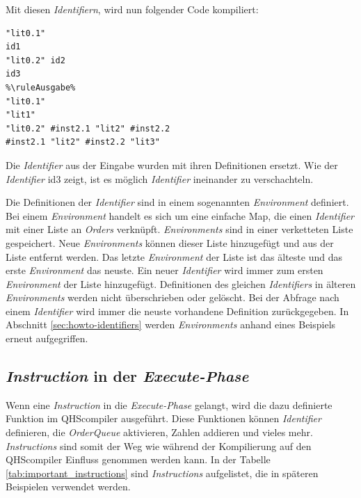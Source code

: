Mit diesen \textit{Identifiern}, wird nun folgender Code kompiliert:

\begin{lstlisting}[language=QHS, caption=QHS-Code zur Veranschaulichung von \textit{Identifiern}]
%\ruleEingabe%
"lit0.1"
id1
"lit0.2" id2
id3
%\ruleAusgabe%
"lit0.1"
"lit1"
"lit0.2" #inst2.1 "lit2" #inst2.2
#inst2.1 "lit2" #inst2.2 "lit3"
\end{lstlisting}

Die \textit{Identifier} aus der Eingabe wurden mit ihren Definitionen ersetzt. Wie der \textit{Identifier} {\listingFont\selectfont id3} zeigt, ist es möglich \textit{Identifier} ineinander zu verschachteln.

Die Definitionen der \textit{Identifier} sind in einem sogenannten \textit{Environment} definiert.
Bei einem \textit{Environment} handelt es sich um eine einfache Map, die einen \textit{Identifier} mit einer Liste an \textit{Orders} verknüpft.
\textit{Environments} sind in einer verketteten Liste gespeichert. Neue \textit{Environments} können dieser Liste hinzugefügt und aus der Liste entfernt werden.
Das letzte \textit{Environment} der Liste ist das älteste und das erste \textit{Environment} das neuste.
Ein neuer \textit{Identifier} wird immer zum ersten \textit{Environment} der Liste hinzugefügt. Definitionen des gleichen \textit{Identifiers} in älteren \textit{Environments} werden nicht überschrieben oder gelöscht.
Bei der Abfrage nach einem \textit{Identifier} wird immer die neuste vorhandene Definition zurückgegeben.
In Abschnitt \ref{sec:howto-identifiers} werden \textit{Environments} anhand eines Beispiels erneut aufgegriffen.

\subsection{\textit{Instruction} in der \textit{Execute-Phase}}
Wenn eine \textit{Instruction} in die \textit{Execute-Phase} gelangt, wird die dazu definierte Funktion im QHScompiler ausgeführt.
Diese Funktionen können \textit{Identifier} definieren, die \textit{OrderQueue} aktivieren, Zahlen addieren und vieles mehr.
\textit{Instructions} sind somit der Weg wie während der Kompilierung auf den QHScompiler Einfluss genommen werden kann.
In der Tabelle \ref{tab:important_instructions} sind \textit{Instructions} aufgelistet, die in späteren Beispielen verwendet werden.

